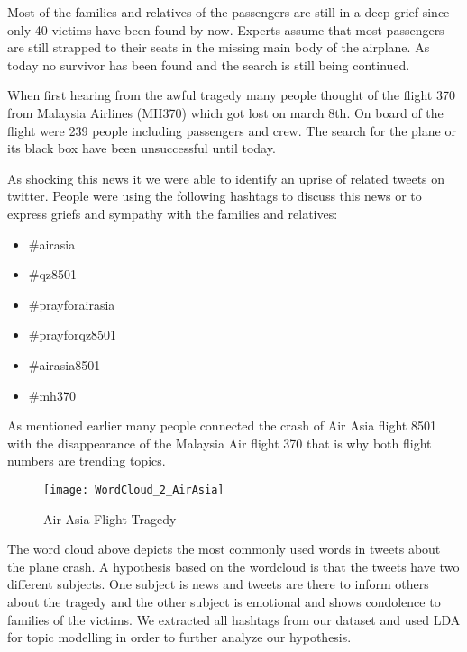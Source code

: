Most of the families and relatives of the passengers are still in a deep grief since only 40 victims have been found by now. Experts assume that most passengers are still strapped to their seats in the missing main body of the airplane. As today no survivor has been found and the search is still being continued.\cite{bbc2014air}

When first hearing from the awful tragedy many people thought of the flight 370 from Malaysia Airlines (MH370) which got lost on march 8th. On board of the flight were 239 people including passengers and crew. The search for the plane or its black box have been unsuccessful until today.\cite{nbc2014by}

As shocking this news it we were able to identify an uprise of related tweets on twitter. People were using the following hashtags to discuss this news or to express griefs and sympathy with the families and relatives:

\begin{multicols}{2}
\begin{itemize}[label={}]
	\item \#airasia
	\item \#qz8501
    \item \#prayforairasia
    \item \#prayforqz8501
    \item \#airasia8501
    \item \#mh370
\end{itemize}
\end{multicols}

As mentioned earlier many people connected the crash of Air Asia flight 8501 with the disappearance of the Malaysia Air flight 370 that is why both flight numbers are trending topics. 

\begin{figure}[H]
  \centering
        \texttt{[image: WordCloud\_2\_AirAsia]}
  \caption[Air Asia Flight Tragedy Word Cloud]{Air Asia Flight Tragedy}
  \label{fig:air-asia-flight-tragedy}
  \vspace{-1.3em}
\end{figure}

The word cloud above depicts the most commonly used words in tweets about the plane crash. A hypothesis based on the wordcloud is that the tweets have two different subjects. One subject is news and tweets are there to inform others about the tragedy and the other subject is emotional and shows condolence to families of the victims.
We extracted all hashtags from our dataset and used LDA for topic modelling in order to further analyze our hypothesis.

